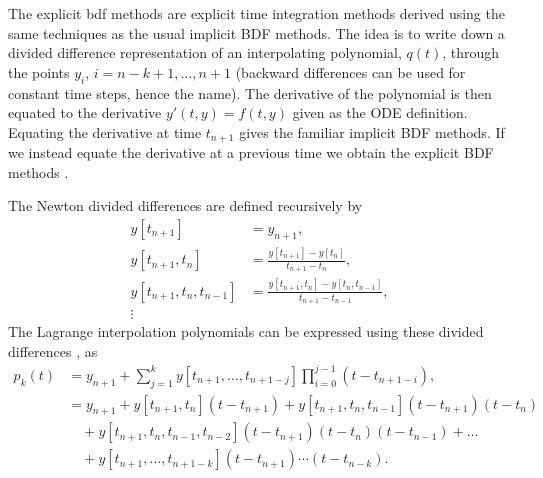 
The explicit bdf methods are explicit time integration methods derived using the same techniques as the usual implicit BDF methods.
The idea is to write down a divided difference representation of an interpolating polynomial, $q(t)$, through the points $y_i$, $i=n-k+1, \ldots, n+1$ (backward differences can be used for constant time steps, hence the name).
The derivative of the polynomial is then equated to the derivative $y'(t, y) = f(t, y)$ given as the ODE definition\cite[pg. 400]{HairerNorsettWanner}.
Equating the derivative at time $t_{n+1}$ gives the familiar implicit BDF methods.
If we instead equate the derivative at a previous time we obtain the explicit BDF methods \cite[pg. 364]{HairerNorsettWanner}.

The Newton divided differences are defined recursively by
\begin{equation}
  \label{eqn:divided-diff}
  \begin{aligned}
    y[t_{n+1}] &= y_{n+1}, \\
    y[t_{n+1}, t_n] &= \frac{y[t_{n+1}] - y[t_n]}{t_{n+1} - t_n}, \\
    y[t_{n+1}, t_n, t_{n-1}] &= \frac{y[t_{n+1}, t_n] - y[t_n, t_{n-1}]}{t_{n+1} - t_{n-1}}, \\
    \vdots
  \end{aligned}
\end{equation} 
The Lagrange interpolation polynomials can be expressed using these divided differences \cite[pg. 124]{BurdenFaires}, \cite[pg. 400]{HairerNorsettWanner} as
\begin{equation}
  \label{eqn:divided-diff-intp}
  \begin{aligned}
    p_k(t) &= y_{n+1} + \sum_{j=1}^k y[t_{n+1}, \ldots, t_{n+1-j}] \prod_{i=0}^{j-1} (t - t_{n+1-i}), \\
    &= y_{n+1} + y[t_{n+1}, t_n](t - t_{n+1}) + y[t_{n+1}, t_n, t_{n-1}](t - t_{n+1})(t - t_n) \\
    &\quad + y[t_{n+1}, t_n, t_{n-1}, t_{n-2}](t - t_{n+1})(t - t_n)(t - t_{n-1}) + \ldots \\
    &\quad + y[t_{n+1}, \ldots, t_{n+1-k}](t-t_{n+1})\cdots(t-t_{n-k}).
  \end{aligned}
\end{equation}

